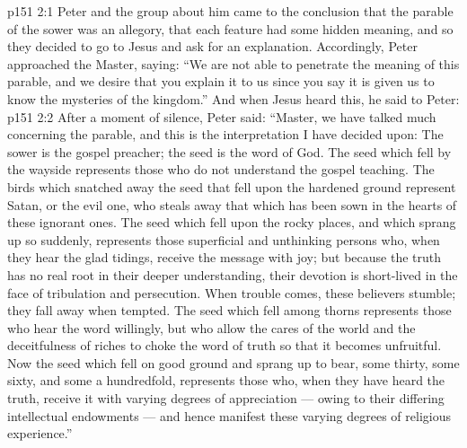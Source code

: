 \vs p151 2:1 Peter and the group about him came to the conclusion that the parable of the sower was an allegory, that each feature had some hidden meaning, and so they decided to go to Jesus and ask for an explanation. Accordingly, Peter approached the Master, saying: “We are not able to penetrate the meaning of this parable, and we desire that you explain it to us since you say it is given us to know the mysteries of the kingdom.” And when Jesus heard this, he said to Peter: 
\vs p151 2:2 After a moment of silence, Peter said: “Master, we have talked much concerning the parable, and this is the interpretation I have decided upon: The sower is the gospel preacher; the seed is the word of God. The seed which fell by the wayside represents those who do not understand the gospel teaching. The birds which snatched away the seed that fell upon the hardened ground represent Satan, or the evil one, who steals away that which has been sown in the hearts of these ignorant ones. The seed which fell upon the rocky places, and which sprang up so suddenly, represents those superficial and unthinking persons who, when they hear the glad tidings, receive the message with joy; but because the truth has no real root in their deeper understanding, their devotion is short\hyp{}lived in the face of tribulation and persecution. When trouble comes, these believers stumble; they fall away when tempted. The seed which fell among thorns represents those who hear the word willingly, but who allow the cares of the world and the deceitfulness of riches to choke the word of truth so that it becomes unfruitful. Now the seed which fell on good ground and sprang up to bear, some thirty, some sixty, and some a hundredfold, represents those who, when they have heard the truth, receive it with varying degrees of appreciation --- owing to their differing intellectual endowments --- and hence manifest these varying degrees of religious experience.”
